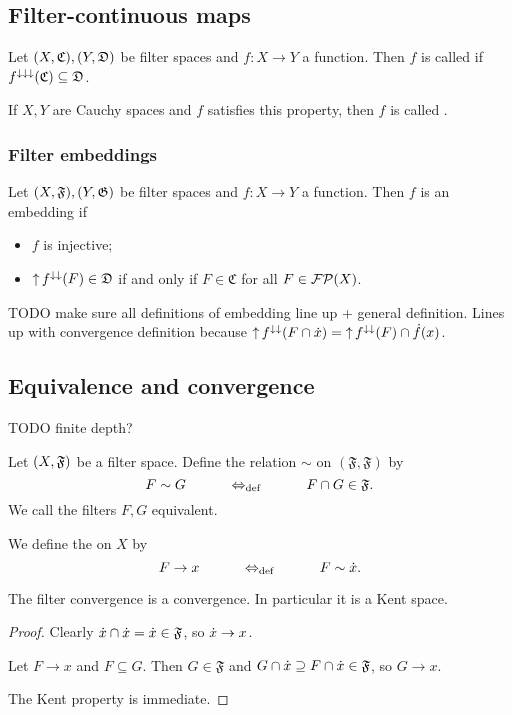 \subsection{Filter-continuous maps}
\begin{definition}
Let $\sSet{X, \mathfrak{C}}, \sSet{Y,\mathfrak{D}}$ be filter spaces and $f: X\to Y$ a function. Then $f$ is called  if $f^{\downarrow\downarrow\downarrow}(\mathfrak{C}) \subseteq \mathfrak{D}$.

If $X,Y$ are Cauchy spaces and $f$ satisfies this property, then $f$ is called .
\end{definition}

\subsubsection{Filter embeddings}
\begin{definition}
Let $\sSet{X, \mathfrak{F}}, \sSet{Y,\mathfrak{G}}$ be filter spaces and $f: X\to Y$ a function. Then $f$ is an embedding if
\begin{itemize}
\item $f$ is injective;
\item $\operatorname{\uparrow} f^{\downarrow\downarrow}(F) \in \mathfrak{D}$ \textup{if and only if} $F\in \mathfrak{C}$ for all $F\in \operatorname{\mathcal{FP}}(X)$.
\end{itemize}
\end{definition}
TODO make sure all definitions of embedding line up + general definition. Lines up with convergence definition because $\operatorname{\uparrow} f^{\downarrow\downarrow}(F\cap \dot{x}) = \operatorname{\uparrow} f^{\downarrow\downarrow}(F) \cap \dot{f}(x)$.

\subsection{Equivalence and convergence}
TODO finite depth?
\begin{definition}
Let $\sSet{X, \mathfrak{F}}$ be a filter space. Define the relation $\sim$ on $(\mathfrak{F},\mathfrak{F})$ by
\[ F \sim G \qquad \quad\Leftrightarrow_{\text{def}}\quad \qquad F\cap G \in \mathfrak{F}. \]
We call the filters $F,G$ equivalent.

We define the  on $X$ by
\[ F \to x \qquad \quad\Leftrightarrow_{\text{def}}\quad \qquad F \sim \dot{x}. \]
\end{definition}

\begin{lemma}
The filter convergence is a convergence. In particular it is a Kent space.
\end{lemma}
\begin{proof}
Clearly $\dot{x}\cap\dot{x} = \dot{x} \in \mathfrak{F}$, so $\dot{x} \to x$.

Let $F\to x$ and $F\subseteq G$. Then $G\in \mathfrak{F}$ and $G\cap \dot{x} \supseteq F \cap\dot{x} \in \mathfrak{F}$, so $G \to x$.

The Kent property is immediate.
\end{proof}

